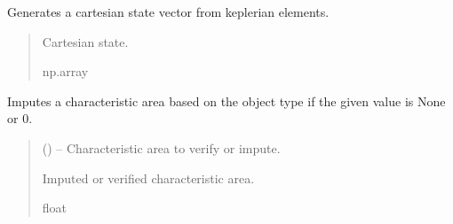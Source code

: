 \documentclass[letterpaper,10pt,english]{sphinxmanual}
\begin{document}
\begin{fulllineitems}
\begin{fulllineitems}
\begin{quote}
\begin{description}
\end{description}\end{quote}

\end{fulllineitems}


\begin{fulllineitems}
\label{\detokenize{fspsim.utils:fspsim.utils.SpaceObject.SpaceObject.generate_cart}}
\pysigstartsignatures
{}
\pysigstopsignatures
\sphinxAtStartPar
Generates a cartesian state vector from keplerian elements.
\begin{quote}\begin{description}
\sphinxAtStartPar
Cartesian state.

\sphinxAtStartPar
np.array

\end{description}\end{quote}

\end{fulllineitems}


\begin{fulllineitems}
\label{\detokenize{fspsim.utils:fspsim.utils.SpaceObject.SpaceObject.impute_char_area}}
\pysigstartsignatures
{}
\pysigstopsignatures
\sphinxAtStartPar
Imputes a characteristic area based on the object type if the given value is None or 0.
\begin{quote}\begin{description}
\sphinxAtStartPar
{} () – Characteristic area to verify or impute.

\sphinxAtStartPar
Imputed or verified characteristic area.

\sphinxAtStartPar
float


\end{description}
\end{quote}
\end{fulllineitems}
\end{fulllineitems}
\end{document}
